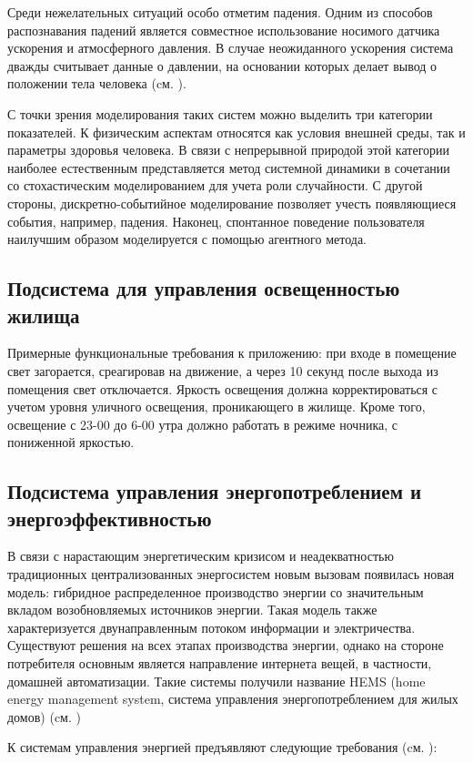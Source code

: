 Среди нежелательных ситуаций особо отметим падения. Одним из способов распознавания падений является совместное использование носимого датчика ускорения и атмосферного давления. В случае неожиданного ускорения система дважды считывает данные о давлении, на основании которых делает вывод о положении тела человека (cм. ).

С точки зрения моделирования таких систем можно выделить три категории показателей. К физическим аспектам относятся как условия внешней среды, так и параметры здоровья человека. В связи с непрерывной природой этой категории наиболее естественным представляется метод системной динамики в сочетании со стохастическим моделированием для учета роли случайности. С другой стороны, дискретно-событийное моделирование позволяет учесть появляющиеся события, например, падения. Наконец, спонтанное поведение пользователя наилучшим образом моделируется с помощью агентного метода.

\subsection{Подсистема для управления освещенностью жилища}
Примерные функциональные требования к приложению: при входе в помещение свет загорается, среагировав на движение, а через 10 секунд после выхода из помещения свет отключается. Яркость освещения должна корректироваться с учетом уровня уличного освещения, проникающего в жилище. Кроме того, освещение с 23-00 до 6-00 утра должно работать в режиме ночника, с пониженной яркостью.

\subsection{Подсистема управления энергопотреблением и энергоэффективностью}
В связи с нарастающим энергетическим кризисом и неадекватностью традиционных централизованных энергосистем новым вызовам появилась новая модель: гибридное распределенное производство энергии со значительным вкладом возобновляемых источников энергии. Такая модель также характеризуется двунаправленным потоком информации и электричества. Существуют решения на всех этапах производства энергии, однако на стороне потребителя основным является направление интернета вещей, в частности, домашней автоматизации. Такие системы получили название HEMS (home energy management system, система управления энергопотреблением для жилых домов) (cм. )

К системам управления энергией предъявляют следующие требования (cм. ):

